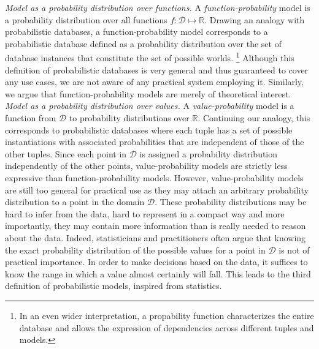 \noindent \emph{Model as a probability distribution over functions.} A
\emph{function-probability} model is a probability distribution over
all functions $f:\mathcal{D} \mapsto \mathbb{R}$. Drawing an analogy
with probabilistic databases, a function-probability model corresponds
to a probabilistic database defined as a probability distribution over
the set of database instances that constitute the set of possible
worlds.%
\footnote{In an even wider interpretation, a propability function characterizes the entire database and allows the expression of dependencies across different tuples and models.}
Although this definition of probabilistic databases is very
general and thus guaranteed to cover any use cases, we are not
aware of any practical system employing it. Similarly, we argue that
function-probability models are merely of theoretical interest.\\

\noindent \emph{Model as a probability distribution over values.} A
\emph{value-probability} model is a function from $\mathcal{D}$ to
probability distributions over $\mathbb{R}$. Continuing our analogy, this
corresponds to probabilistic databases where each tuple has
a set of possible instantiations with associated probabilities that
are independent of those of the other tuples. Since each point in
$\mathcal{D}$ is assigned a probability distribution independently of the
other points, value-probability models are strictly less expressive than
function-probability models. However, value-probability models are
still too general for practical use as they may attach an arbitrary
probability distribution to a point in the domain $\mathcal{D}$.
These probability distributions may be hard to infer from the data,
hard to represent in a compact way and more importantly, they may
contain more information than is really needed to reason about the data.
Indeed, statisticians and practitioners often argue that knowing the exact probability distribution
of the possible values for a point in $\mathcal{D}$ is not of
practical importance. In order to make decisions based on the data, it suffices to
know the range in which a value almost certainly will fall. This leads to
the third definition of probabilistic models, inspired from statistics.\\


